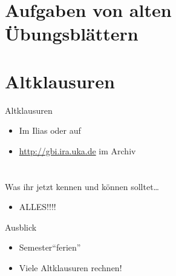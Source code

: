 \section{Aufgaben von alten Übungsblättern}



\section{Altklausuren}
\begin{frame}{Altklausuren}
    \begin{itemize}
    	\item Im Ilias oder auf 
    	\item \url{http://gbi.ira.uka.de} im Archiv
    \end{itemize}
\end{frame}

\section{}

	\begin{frame}{Was ihr jetzt kennen und können solltet\dots}
			\begin{itemize}
				\item ALLES!!!!
			\end{itemize}
	
	\end{frame}
	\begin{frame}{Ausblick}
		\begin{itemize}
			\item Semester``ferien''
			\item Viele Altklausuren rechnen!
		\end{itemize}
	\end{frame}
\section{}
\questionframe
{}
